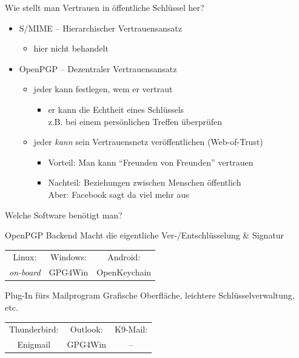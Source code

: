 \begin{frame}{Wie stellt man Vertrauen in öffentliche Schlüssel her?}
  \begin{itemize}
    \item S/MIME -- Hierarchischer Vertrauensansatz
    \begin{itemize}
      \item hier nicht behandelt
    \end{itemize}
    \item OpenPGP -- Dezentraler Vertrauensansatz
    \begin{itemize}
      \item jeder kann festlegen, wem er vertraut
      \begin{itemize}
        \item er kann die Echtheit eines Schlüssels\\ z.B. bei einem persönlichen Treffen überprüfen
      \end{itemize}
      \item jeder \emph{kann} sein Vertrauensnetz veröffentlichen (Web-of-Trust)
      \begin{itemize}
        \item Vorteil: Man kann ``Freunden von Freunden'' vertrauen
        \item Nachteil: Beziehungen zwischen Menschen öffentlich\\ Aber: Facebook sagt da viel mehr aus
      \end{itemize}
    \end{itemize}
  \end{itemize}
\end{frame}

\begin{frame}{Welche Software benötigt man?}
  \begin{block}{OpenPGP Backend}
    Macht die eigentliche Ver-/Entschlüsselung \& Signatur

    \vspace{1ex}
    \begin{tabular}{ccc}
      Linux:            & Windows: & Android:     \\
      \textit{on-board} & GPG4Win  & OpenKeychain \\
    \end{tabular}
  \end{block}
  \begin{block}{Plug-In fürs Mailprogram}
    Grafische Oberfläche, leichtere Schlüsselverwaltung, etc.

    \vspace{1ex}
    \begin{tabular}{ccc}
      Thunderbird: & Outlook: & K9-Mail: \\
      Enigmail     & GPG4Win  & --       \\
    \end{tabular}
  \end{block}
\end{frame}

